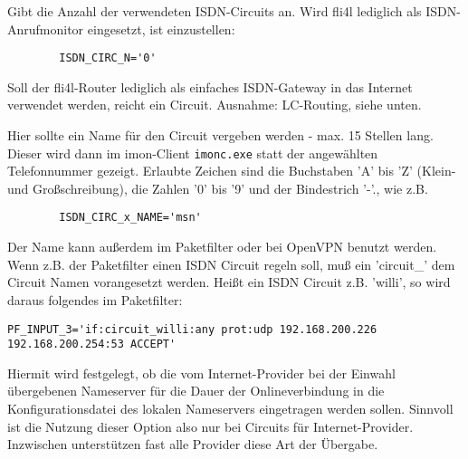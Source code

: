 \begin{description}

  
  Gibt die Anzahl der verwendeten ISDN-Circuits an. Wird fli4l
  lediglich als ISDN-Anrufmonitor eingesetzt, ist einzustellen:

\begin{example}
\begin{verbatim}
        ISDN_CIRC_N='0'
\end{verbatim}
\end{example}
  
  Soll der fli4l-Router lediglich als einfaches ISDN-Gateway in das
  Internet verwendet werden, reicht ein Circuit. Ausnahme: LC-Routing,
  siehe unten.


  
  Hier sollte ein Name für den Circuit vergeben werden - max. 15
  Stellen lang. Dieser wird dann im imon-Client \texttt{imonc.exe} statt der
  angewählten Telefonnummer gezeigt. Erlaubte Zeichen sind die
  Buchstaben 'A' bis 'Z' (Klein- und Großschreibung), die Zahlen '0'
  bis '9' und der Bindestrich '-'., wie z.B.

\begin{example}
\begin{verbatim}
        ISDN_CIRC_x_NAME='msn'
\end{verbatim}
\end{example}

  Der Name kann außerdem im Paketfilter oder bei OpenVPN
  benutzt werden. Wenn  z.B. der Paketfilter einen ISDN Circuit
  regeln soll, muß ein 'circuit\_' dem Circuit Namen vorangesetzt werden.
  Heißt ein ISDN Circuit z.B. 'willi', so wird daraus folgendes im Paketfilter:

\begin{example}
\begin{verbatim}
PF_INPUT_3='if:circuit_willi:any prot:udp 192.168.200.226 192.168.200.254:53 ACCEPT'
\end{verbatim}
\end{example}


  Hiermit wird festgelegt, ob die vom Internet-Provider bei der
  Einwahl übergebenen Nameserver für die Dauer der Onlineverbindung in
  die Konfigurationsdatei des lokalen Nameservers eingetragen
  werden sollen.  Sinnvoll ist die Nutzung dieser Option also nur bei
  Circuits für Internet-Provider.  Inzwischen unterstützen fast alle
  Provider diese Art der Übergabe.
  

\end{description}
